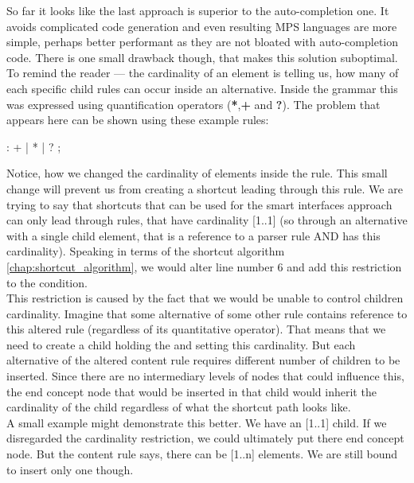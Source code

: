 So far it looks like the last approach is superior to the auto-completion one. It avoids complicated code generation and even resulting MPS languages are more simple, perhaps better performant as they are not bloated with auto-completion code. There is one small drawback though, that makes this solution suboptimal.
\\

To remind the reader --- the cardinality of an element is telling us, how many of each specific child rules can occur inside an alternative. Inside the grammar this was expressed using quantification operators (\textbf{*},\textbf{+} and \textbf{?}). The problem that appears here can be shown using these example rules:

\begin{antlr}
      :   +
             |   *
             |   ?
             ;
\end{antlr}

Notice, how we changed the cardinality of elements inside the  rule. This small change will prevent us from creating a shortcut leading through this rule. We are trying to say that shortcuts that can be used for the smart interfaces approach can only lead through rules, that have cardinality [1..1] (so through an alternative with a single child element, that is a reference to a parser rule AND has this cardinality). Speaking in terms of the shortcut algorithm \ref{chap:shortcut_algorithm}, we would alter line number 6 and add this restriction to the condition.
\\

This restriction is caused by the fact that we would be unable to control children cardinality. Imagine that some alternative of some other rule contains reference to this altered  rule (regardless of its quantitative operator). That means that we need to create a child holding the  and setting this cardinality. But each alternative of the altered content rule requires different number of children to be inserted. Since there are no intermediary levels of nodes that could influence this, the end concept node that would be inserted in that child would inherit the cardinality of the child regardless of what the shortcut path looks like.
\\

A small example might demonstrate this better. We have an  [1..1] child. If we disregarded the cardinality restriction, we could ultimately put there  end concept node. But the content rule says, there can be [1..n] elements. We are still bound to insert only one though.
